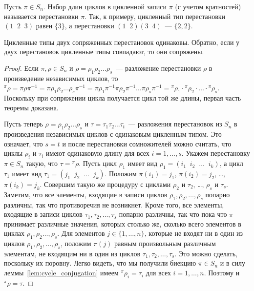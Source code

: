 \begin{definition}
Пусть $\pi\in S_n$. Набор длин циклов в цикленной записи
$\pi$ (с учетом кратностей) называется 
перестановки $\pi$. Так, к примеру, цикленный тип перестановки
$(1\;\;2\;\;3)$ равен $\{3\}$, а перестановки $(1\;\;2)(3\;\;4)$~---
$\{2,2\}$.
\end{definition}

\begin{theorem}\label{thm:cycles_and_conjugation_classes}
Цикленные типы двух сопряженных перестановок одинаковы. Обратно, если
у двух перестановок цикленные типы совпадают, то они сопряжены.
\end{theorem}

\begin{proof}
Если $\pi,\rho\in S_n$ и $\rho=\rho_1\rho_2\dots\rho_s$~--- разложение
перестановки $\rho$ в произведение независимых циклов,
то ${}^\pi\rho = \pi\rho\pi^{-1} = \pi\rho_1\rho_2\dots\rho_s\pi^{-1}
= \pi\rho_1\pi^{-1}\pi\rho_2\pi^{-1}\dots\pi\rho_s\pi^{-1} =
{}^\pi\rho_1\cdot {}^\pi\rho_2\cdot\dots\cdot {}^\pi\rho_s$. Поскольку
при сопряжении цикла получается цикл той же длины, первая часть
теоремы доказана.

Пусть теперь $\rho=\rho_1\rho_2\dots\rho_s$ и
$\tau=\tau_1\tau_2\dots\tau_t$~--- разложения перестановок из $S_n$ в
произведения независимых циклов с одинаковым цикленным типом. Это
означает, что $s=t$ и после перестановки сомножителей можно считать,
что циклы $\rho_i$ и $\tau_i$ имеют одинаковую длину для всех
$i=1,\dots,s$. Укажем перестановку $\pi\in S_n$ такую, что
$\tau = {}^\pi\rho$. Пусть цикл $\rho_1$ имеет вид
$\rho_1 = (i_1\;\;i_2\;\;\dots\;\;i_k)$, а цикл $\tau_1$ имеет вид
$\tau_1 = (j_1\;\;j_2\;\;\dots\;\;j_k)$.
Положим $\pi(i_1) = j_1$, $\pi(i_2) = j_2$, \dots, $\pi(i_k) = j_k$.
Совершим такую же процедуру с циклами $\rho_2$ и $\tau_2$, \dots,
$\rho_s$ и $\tau_s$. Заметим, что все элементы, входящие в записи
циклов $\rho_1,\rho_2,\dots,\rho_s$ попарно различны, так что
противоречия не возникнет. Кроме того, все элементы, входящие в записи
циклов $\tau_1,\tau_2,\dots,\tau_s$ попарно различны, так что пока что
$\pi$ принимает различные значения, которых столько же, сколько всего
элементов в циклах $\rho_1,\rho_2\dots,\rho_s$.
Для элементов $j\in\{1,\dots,n\}$, которые
не входят ни в один из циклов $\rho_1,\rho_2,\dots,\rho_s$, положим
$\pi(j)$ равным произвольным различным элементам, не входящим ни в
один из циклов $\tau_1,\tau_2,\dots,\tau_s$. Это можно сделать,
поскольку их поровну. Легко видеть, что мы получили биекцию $\pi\in
S_n$ и в силу леммы~\ref{lem:cycle_conjugation} имеем
${}^\pi\rho_i = \tau_i$ для всех $i=1,\dots,n$. Поэтому
и ${}^\pi\rho = \tau$.
\end{proof}

